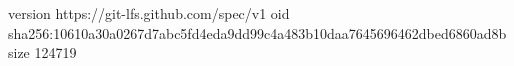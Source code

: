 version https://git-lfs.github.com/spec/v1
oid sha256:10610a30a0267d7abc5fd4eda9dd99c4a483b10daa7645696462dbed6860ad8b
size 124719
